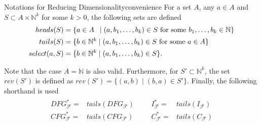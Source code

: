 \begin{definition}{Notations for Reducing Dimensionality}{convenience}
    For a set $A$, any $a\in A$ and $S\subset A\times\mathbb N^k$ for some $k>0$, the
    following sets are defined
    \begin{align*}
        heads(S)={}&\{a\in A\hspace{1.8mm}\mid(a,b_1,\dots,b_k)\in S\text{ for some }b_1,\dots,b_k\in\mathbb N\}\\
        tails(S)={}&\{b\in\mathbb N^k\mid(a,b_1,\dots,b_k)\in S\text{ for some }a\in A\}\\
        select(a,S)={}&\{b\in\mathbb N^k\mid(a,b_1,\dots,b_k)\in S\}.
    \end{align*}

    Note that the case $A=\mathbb N$ is also valid.
    Furthermore, for $S'\subset\mathbb N^k$, the set $rev(S')$ is defined as
    $rev(S')=\{(a,b)\mid(b,a)\in S'\}$.
    Finally, the following shorthand is used
    \begin{align*}
        \begin{aligned}
        DFG_\mathcal F^*={}&tails(DFG_\mathcal F)\\
        CFG_\mathcal F^*={}&tails(CFG_\mathcal F)
        \end{aligned}&&
        \begin{aligned}
        I_\mathcal F^*={}&tails(I_\mathcal F)\\
        C_\mathcal F^*={}&tails(C_\mathcal F)
        \end{aligned}
    \end{align*}
\end{definition}